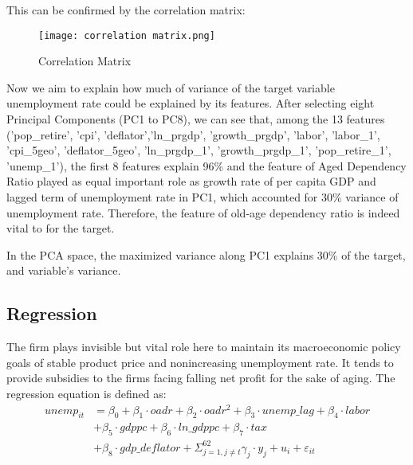 \documentclass[ %
    final,
    scrbook,
    listoffigures,
    listoftables, 
    glossary]{cu-thesis}
\begin{document}
This can be confirmed by the correlation matrix:
\begin{figure}[h]
\centering
\texttt{[image: correlation matrix.png]}
\caption{Correlation Matrix}
\end{figure}


Now we aim to explain how much of variance of the target variable unemployment rate could be explained by its features. After selecting eight Principal Components (PC1 to PC8), we can see that, among the 13 features ('pop\_retire', 'cpi', 'deflator','ln\_prgdp', 'growth\_prgdp', 'labor', 'labor\_1', 'cpi\_5geo', 'deflator\_5geo', 'ln\_prgdp\_1', 'growth\_prgdp\_1', 
'pop\_retire\_1', 'unemp\_1'), the first 8 features explain 96\%  and the feature of Aged Dependency Ratio played as equal important role as growth rate of per capita GDP and lagged term of unemployment rate in PC1, which accounted for 30\% variance of unemployment rate.
Therefore, the feature of old-age dependency ratio is indeed vital to for the target.

In the PCA space, the maximized variance along PC1 explains 30\% of the target, and  variable's variance. 

\subsection{Regression}

The firm plays invisible but vital role here to maintain its macroeconomic policy goals of stable product price and nonincreasing unemployment rate. It tends to provide subsidies to the firms facing falling net profit for the sake of aging. 
\fi
The regression equation is defined as:
\begin{equation} \label{eq reg}
\begin{split}
unemp_{it} &= \beta_{0}+\beta_{1}\cdot oadr+\beta_{2}\cdot oadr^2+\beta_{3}\cdot unemp\_lag+\beta_{4}\cdot labor\\
&+\beta_{5}\cdot gdppc+\beta_{6}\cdot ln\_gdppc+\beta_{7}\cdot tax\\
&+\beta_{8}\cdot gdp\_deflator+\Sigma_{j=1,j\neq t}^{62}\gamma_{j}\cdot y_{j}+u_{i}+\varepsilon_{it}
\end{split}
\end{equation}
\end{document}
